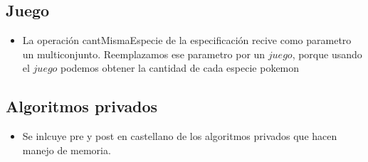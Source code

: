 
\subsection{Juego}

\begin{itemize}
\item{La operaci\'on cantMismaEspecie de la especificaci\'on recive como parametro un multiconjunto. 
Reemplazamos ese parametro por un $juego$, porque usando el $juego$ podemos obtener la cantidad de cada especie pokemon}

\end{itemize}


\subsection{Algoritmos privados}

\begin{itemize}

\item{Se inlcuye pre y post en castellano de los algoritmos privados que hacen manejo de memoria.}

\end{itemize}

